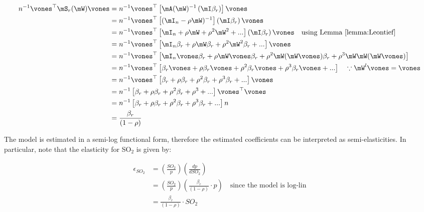 \documentclass[english,12pt]{book}\usepackage[]{graphicx}\usepackage[]{xcolor}
\begin{document}
\begin{example}
\begin{equation}\label{eq:total_effect_simple}
  \begin{aligned}
    n^{-1}\vones^\top\mS_r(\mW)\vones & = n^{-1}\vones^\top\left[\mA(\mW)^{-1}\left(\mI\beta_r\right)\right]\vones \\
                                  & = n^{-1}\vones^\top\left[(\mI_n - \rho\mW)^{-1}\right]\left(\mI\beta_r\right)\vones \\
                                  & =   n^{-1}\vones^\top\left[\mI_n + \rho\mW + \rho^2\mW^2 + ... \right]\left(\mI\beta_r\right)\vones \quad\mbox{using Lemma \ref{lemma:Leontief}} \\
                                  & = n^{-1} \vones^\top\left[\mI_n\beta_r + \rho\mW\beta_r + \rho^2\mW^2\beta_r + ... \right]\vones \\
                                  & = n^{-1} \vones^\top\left[\mI_n\vones\beta_r + \rho\mW\vones\beta_r + \rho^2\mW(\mW\vones)\beta_r + \rho^3\mW\mW(\mW\vones) \right] \\
                                  & = n^{-1} \vones^\top\left[\beta_r\vones + \rho\beta_r\vones + \rho^2\beta_r\vones + \rho^3\beta_r\vones + ... \right]\quad \because \mW^l\vones = \vones \\
                                  & = n^{-1} \vones^\top\left[\beta_r + \rho\beta_r + \rho^2\beta_r + \rho^3\beta_r + ... \right]\vones\\
                                  & = n^{-1} \left[\beta_r + \rho\beta_r + \rho^2\beta_r + \rho^3 + ... \right] \vones^\top\vones\\
                                  & = n^{-1} \left[\beta_r + \rho\beta_r + \rho^2\beta_r + \rho^3\beta_r + ... \right] n \\
                                  & = \frac{\beta_r}{(1 - \rho)}
  \end{aligned}
\end{equation}

The model is estimated in a semi-log functional form, therefore the estimated coefficients can be interpreted as semi-elasticities. In particular, note that the elasticity for SO$_2$ is given by:

\begin{equation}
  \begin{aligned}
    \epsilon_{SO_2} & = \left(\frac{SO_2}{p}\right)\left(\frac{d p}{d SO_2}\right) \\
                      & = \left(\frac{SO_2}{p}\right)\left(\frac{\beta_r}{(1 - \rho)}\cdot p\right)\quad \mbox{since the model is log-lin} \\
                      & = \frac{\beta_r}{(1 - \rho)}\cdot SO_2
  \end{aligned}
\end{equation}


\end{example}
\end{document}
